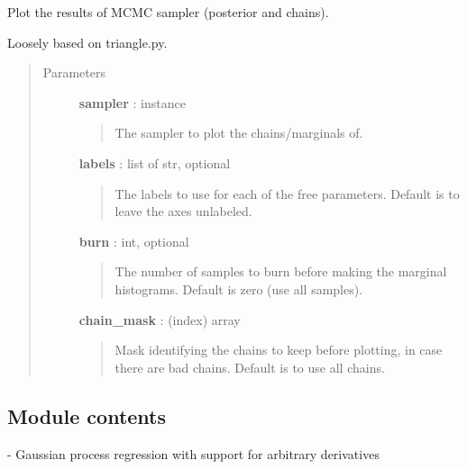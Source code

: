 \documentclass[letterpaper,10pt,english]{sphinxmanual}
\begin{document}

\begin{fulllineitems}
\label{gptools:gptools.utils.plot_sampler}
Plot the results of MCMC sampler (posterior and chains).

Loosely based on triangle.py.
\begin{quote}\begin{description}
\item[{Parameters}] \leavevmode
\textbf{sampler} :  instance
\begin{quote}

The sampler to plot the chains/marginals of.
\end{quote}

\textbf{labels} : list of str, optional
\begin{quote}

The labels to use for each of the free parameters. Default is to leave
the axes unlabeled.
\end{quote}

\textbf{burn} : int, optional
\begin{quote}

The number of samples to burn before making the marginal histograms.
Default is zero (use all samples).
\end{quote}

\textbf{chain\_mask} : (index) array
\begin{quote}

Mask identifying the chains to keep before plotting, in case there are
bad chains. Default is to use all chains.
\end{quote}

\end{description}\end{quote}

\end{fulllineitems}



\subsection{Module contents}
\label{gptools:module-contents}\label{gptools:module-gptools}
{\hyperref[gptools:module-gptools]{}} - Gaussian process regression with support for arbitrary derivatives
\end{document}
